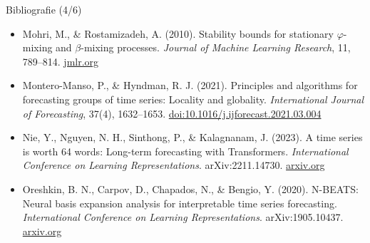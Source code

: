 \begin{frame}{Bibliografie (4/6)}
\begin{itemize}
    \item Mohri, M., \& Rostamizadeh, A. (2010). Stability bounds for stationary $\varphi$-mixing and $\beta$-mixing processes. \textit{Journal of Machine Learning Research}, 11, 789--814. \href{https://jmlr.org/papers/v11/mohri10a.html}{jmlr.org}
    \item Montero-Manso, P., \& Hyndman, R. J. (2021). Principles and algorithms for forecasting groups of time series: Locality and globality. \textit{International Journal of Forecasting}, 37(4), 1632--1653. \href{https://doi.org/10.1016/j.ijforecast.2021.03.004}{doi:10.1016/j.ijforecast.2021.03.004}
    \item Nie, Y., Nguyen, N. H., Sinthong, P., \& Kalagnanam, J. (2023). A time series is worth 64 words: Long-term forecasting with Transformers. \textit{International Conference on Learning Representations}. arXiv:2211.14730. \href{https://arxiv.org/abs/2211.14730}{arxiv.org}
    \item Oreshkin, B. N., Carpov, D., Chapados, N., \& Bengio, Y. (2020). N-BEATS: Neural basis expansion analysis for interpretable time series forecasting. \textit{International Conference on Learning Representations}. arXiv:1905.10437. \href{https://arxiv.org/abs/1905.10437}{arxiv.org}
\end{itemize}
\end{frame}


